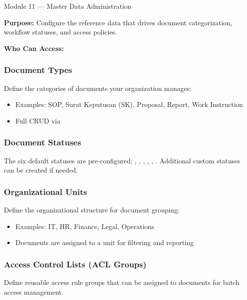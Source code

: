 \begin{ugModule}{Module 11 --- Master Data Administration}

  \textbf{Purpose:}
  Configure the reference data that drives document
  categorization, workflow statuses, and access policies.

  \textbf{Who Can Access:}

  \subsubsection*{Document Types}
  Define the categories of documents your organization manages:
  \begin{itemize}[leftmargin=18pt]
    \item Examples: SOP, Surat Keputusan (SK), Proposal,
      Report, Work Instruction
    \item Full CRUD via 
  \end{itemize}

  \subsubsection*{Document Statuses}
  The six default statuses are pre-configured:
  ,
  ,
  ,
  ,
  ,
  .
  Additional custom statuses can be created if needed.

  \subsubsection*{Organizational Units}
  Define the organizational structure for document grouping:
  \begin{itemize}[leftmargin=18pt]
    \item Examples: IT, HR, Finance, Legal, Operations
    \item Documents are assigned to a unit for filtering and
      reporting
  \end{itemize}

  \subsubsection*{Access Control Lists (ACL Groups)}
  Define reusable access rule groups that can be assigned to
  documents for batch access management.
\end{ugModule}

